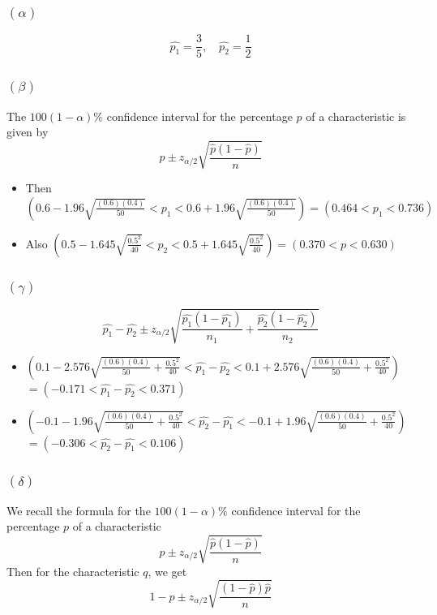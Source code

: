 \documentclass{article}
\begin{document}
\subsubsection*{\((\alpha)\)}
\[
	\hat{p_1} = \frac{3}{5}, \quad \hat{p_2} = \frac{1}{2}
\]

\subsubsection*{\((\beta)\)}
The \(100(1- \alpha)\%\) confidence interval for the percentage \(p\) of a characteristic
is given by
\[
	p \pm z_{\alpha/2}\sqrt{\frac{\hat{p}(1- \hat{p})}{n}}
\]
\begin{itemize}
	\item Then \((0.6 - 1.96\sqrt{\frac{(0.6)(0.4)}{50}} < p_1 < 0.6 + 1.96 \sqrt{\frac{(0.6)(0.4)}{50}})
	      = (0.464 < p_1 < 0.736)\)
	\item Also \((0.5 - 1.645 \sqrt{\frac{0.5^2}{40}} < p_2 < 0.5 + 1.645 \sqrt{\frac{0.5^2}{40}})
	      = (0.370 < p < 0.630)\)
\end{itemize}

\subsubsection*{\((\gamma)\)}
\[
	\hat{p_1} - \hat{p_2} \pm z_{\alpha/2} \sqrt{\frac{\hat{p_1}(1 - \hat{p_1})}{n_1} + \frac{\hat{p_2}(1-\hat{p_2})}{n_2}}
\]

\begin{itemize}
	\item \(\left(0.1 - 2.576\sqrt{\frac{(0.6)(0.4)}{50}+ \frac{0.5^2}{40}} < \hat{p_1} - \hat{p_2} < 0.1 + 2.576\sqrt{\frac{(0.6)(0.4)}{50}+ \frac{0.5^2}{40}}\right)\)
	      \\
	      \(= (-0.171 < \hat{p_1} - \hat{p_2} < 0.371)\)
	      \\

	\item \(\left(-0.1 - 1.96\sqrt{\frac{(0.6)(0.4)}{50}+ \frac{0.5^2}{40}} < \hat{p_2} - \hat{p_1} < -0.1 + 1.96\sqrt{\frac{(0.6)(0.4)}{50}+ \frac{0.5^2}{40}} \right)\)
	      \\
	      \(= ( -0.306 < \hat{p_2} - \hat{p_1} < 0.106)\)
\end{itemize}





\subsubsection*{\((\delta)\)}
We recall the formula for the \(100(1- \alpha)\%\) confidence interval for the
percentage \(p\) of a characteristic
\[
	p \pm z_{\alpha/2}\sqrt{\frac{\hat{p}(1- \hat{p})}{n}}
\]
Then for the characteristic \(q\), we get
\[
	1 - p \pm z_{\alpha/2}\sqrt{\frac{(1-\hat{p})\hat{p}}{n}}
\]
\end{document}
